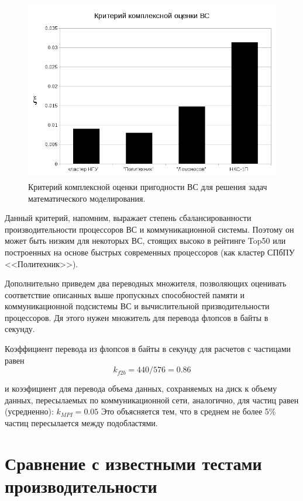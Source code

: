 \begin{figure}[htb]
	\begin{center}
		\includegraphics[height=8cm,keepaspectratio]{images/modern_PIC_params_xi_new.png}
	\end{center}
	\caption{Критерий комплексной оценки пригодности ВС для решения задач математического моделирования.}
	\label{xi}
\end{figure} 
Данный критерий, напомним, выражает степень сбалансированности производительности процессоров ВС и коммуникационной системы. Поэтому он может быть низким для некоторых ВС, стоящих высоко в рейтинге Top50 или построенных на основе быстрых современных процессоров (как кластер СПбПУ <<Политехник>>).

Дополнительно приведем два переводных множителя, позволяющих оценивать соответствие описанных выше пропускных способностей памяти и коммуникационной подсистемы ВС и вычислительной призводительности процессоров. Дя этого нужен множитель для перевода флопсов в байты в секунду.

Коэффициент перевода из флопсов в байты в секунду для расчетов с частицами равен
\begin{equation}
\label{kf2b}
k_{f2b} = 440/576 = 0.86
\end{equation}  
 
и коээфициент для перевода объема данных, сохраняемых на диск к объему данных, пересылаемых по коммуникационной сети, аналогично, для частиц равен (усредненно):
$k_{MPI} = 0.05$ 
Это объясняется тем, что в среднем не более 5\% частиц пересылается между подобластями.




\section{Сравнение с известными тестами производительности}

